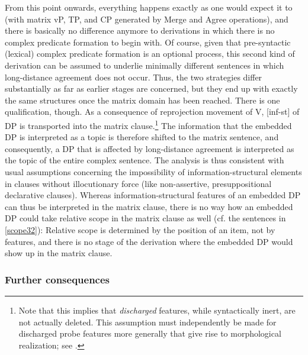 \documentclass[output=paper
,modfonts
,nonflat]{langsci/langscibook}
\begin{document}
	From this point onwards, everything happens exactly as one would
	expect it to (with matrix vP, TP, and CP generated by Merge and Agree
	operations), and there is basically no difference anymore to
	derivations in which there is no complex predicate formation to begin
	with.  Of course, given that pre-syntactic (lexical) complex predicate
	formation is an optional process, this second kind of derivation can
	be assumed to underlie minimally different sentences in which
	long-distance agreement does not occur. Thus, the two strategies
	differ substantially as far as earlier stages are concerned, but they
	end up with exactly the same structures once the matrix domain has
	been reached. There is one qualification, though. 
	As a consequence of reprojection movement of V, [inf-st] of
	DP is
	transported into the matrix clause.\footnote{Note that this implies
		that {\itshape discharged} features, while syntactically inert, are not
		actually deleted. This assumption
		must independently be made for
		discharged probe features more generally that give rise to
		morphological realization; see \cite{Adger:03}.} 
	The information that the embedded DP\sub{\textit{[inf-st]}}
	is interpreted as a topic is therefore shifted to the matrix
	sentence, and consequently, a DP that is affected by long-distance
	agreement is interpreted as the topic of the entire complex sentence.
	The analysis is thus consistent with usual assumptions concerning the impossibility
	of information-struc\-tural elements in clauses without
	illocutionary force (like non-assertive, presuppositional
	declarative clauses). Whereas information-structural features of an
	embedded DP can thus be interpreted in the matrix clause, there is
	no way how an embedded DP could take relative scope in the matrix clause as
	well (cf. the sentences in \ref{scope32}): Relative scope is
	determined by the position of an item, not by features, and there is no stage of
	the derivation where the embedded DP would show up in the
	matrix clause. 
	
	\subsubsection{Further consequences}
	
\end{document}
